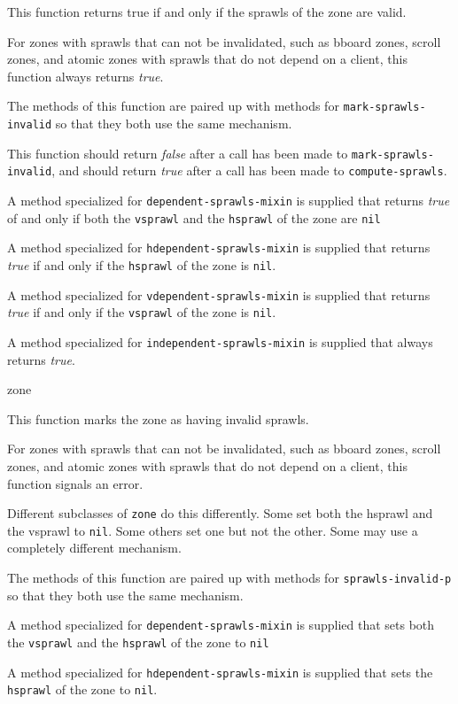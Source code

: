 This function returns true if and only if the sprawls of the zone are
valid.  

For zones with sprawls that can not be invalidated, such as bboard
zones, scroll zones, and atomic zones with sprawls that do not depend
on a client, this function always returns \emph{true}.

The methods of this function are paired up with methods for
\texttt{mark-sprawls-invalid} so that they both use the same mechanism. 

This function should return \emph{false} after a call has been made to
\texttt{mark-sprawls-invalid}, and should return \emph{true} after a
call has been made to \texttt{compute-sprawls}.  

A method specialized for \texttt{dependent-sprawls-mixin} is supplied
that returns \emph{true} of and only if both the \texttt{vsprawl} and
the \texttt{hsprawl} of the zone are \texttt{nil}

A method specialized for \texttt{hdependent-sprawls-mixin} is supplied
that returns \emph{true} if and only if the \texttt{hsprawl} of the zone
is \texttt{nil}.

A method specialized for \texttt{vdependent-sprawls-mixin} is supplied
that returns \emph{true} if and only if the \texttt{vsprawl} of the zone
is \texttt{nil}.

A method specialized for \texttt{independent-sprawls-mixin} is supplied
that always returns \emph{true}. 

 {zone}

This function marks the zone as having invalid sprawls.  

For zones with sprawls that can not be invalidated, such as bboard
zones, scroll zones, and atomic zones with sprawls that do not depend
on a client, this function signals an error.

Different subclasses of \texttt{zone} do this differently.  Some set
both the hsprawl and the vsprawl to \texttt{nil}.  Some others set one but
not the other.  Some may use a completely different mechanism.

The methods of this function are paired up with methods for
\texttt{sprawls-invalid-p} so that they both use the same mechanism.

A method specialized for \texttt{dependent-sprawls-mixin} is supplied
that sets both the \texttt{vsprawl} and the \texttt{hsprawl} of the zone
to \texttt{nil}

A method specialized for \texttt{hdependent-sprawls-mixin} is supplied
that sets the \texttt{hsprawl} of the zone to \texttt{nil}.

